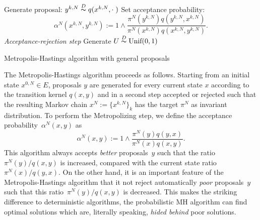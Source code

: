 \IncMargin{1em}
\begin{algorithm}[htb]
\DontPrintSemicolon


\BlankLine

{
  Generate proposal: $ y^{k,N} \stackrel{D}{\thicksim} q(x^{k,N}, \cdot \;) $\;
  Set acceptance probability:
  \begin{equation*}
   \alpha^{N} ( x^{k,N}, y^{k,N} ) := 1 \wedge \dfrac{\pi^{N}(y^{k,N}) q(y^{k,N},x^{k,N}) }{\pi^{N}(x^{k,N}) q(x^{k,N},y^{k,N})}.    
  \end{equation*}\label{MHAlgo-AcceptanceProba}
  \emph{Acceptance-rejection step}\;
  Generate $ U \stackrel{D}{\thicksim} \text{Unif}(0,1) $\;

}
\caption{Metropolis-Hastings algorithm with general proposals}\label{Algo-MH}
\end{algorithm}\DecMargin{1em}

The Metropolis-Hastings algorithm proceeds as follows. Starting from an initial state $ x^{0,N} \in E $,  proposals $y$ are generated for every current state $x$ according to the transition kernel $ q (x, y) $ and in a second step accepted or rejected such that the resulting Markov chain $ x^{N} := \{ x^{k,N} \}_{k} $ has the target $ \pi^{N} $ as invariant distribution. To perform the Metropolizing step, we define the acceptance probability~$\alpha^N(x, y)$ as
\begin{equation}
 \label{MH-Acceptance probability definition}
 \alpha^{N}(x,y)  := 1 \wedge \dfrac{\pi^{N}(y) q(y,x) }{\pi^{N}(x) q(x,y)}.
\end{equation}
This algorithm always accepts \textit{better} proposals~$y$ such that the ratio~$ \pi^{N}(y) / q(x,y) $ is increased, compared with the current state ratio~$ \pi^{N}(x) / q(y,x) $. On the other hand, it is an important feature of the Metropolis-Hastings algorithm that it not reject automatically \textit{poor} proposals~$y$ such that this ratio~$ \pi^{N}(y) / q(x,y) $ is decreased. This makes the striking difference to deterministic algorithms, the probabilistic MH algorithm can find optimal solutions which are, literally speaking, \textit{hided behind} poor solutions.

